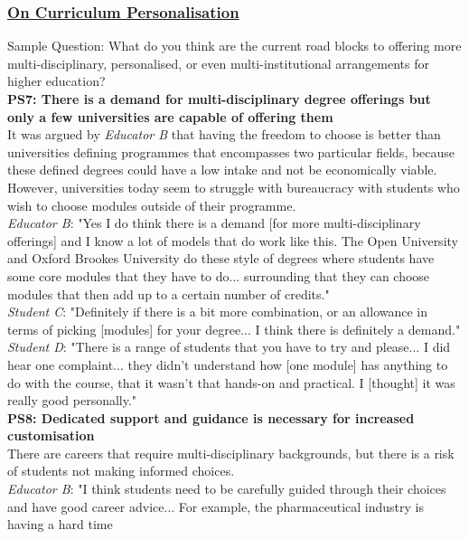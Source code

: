 \subsubsection{\underline{On Curriculum Personalisation}}

Sample Question: What do you think are the current road blocks to offering more multi-disciplinary, 
personalised, or even multi-institutional arrangements for higher education?
\vspace{0.25cm}\\
\textbf{PS7: There is a demand for multi-disciplinary degree offerings but only a few 
universities are capable of offering them}\\
It was argued by \textit{Educator B} that having the freedom to choose is better than universities 
defining programmes that encompasses two particular fields, because these defined degrees could have 
a low intake and not be economically viable. However, universities today seem to struggle with bureaucracy 
with students who wish to choose modules outside of their programme.\\
\textit{Educator B}: "Yes I do think there is a demand [for more multi-disciplinary offerings] and I know 
a lot of models that do work like this. The Open University and Oxford Brookes University do these 
style of degrees where students have some core modules that they have to do... surrounding that 
they can choose modules that then add up to a certain number of credits." \\
\textit{Student C}: "Definitely if there is a bit more combination, or an allowance in terms of 
picking [modules] for your degree... I think there is definitely a demand."\\
\textit{Student D}: "There is a range of students that you have to try and please...
I did hear one complaint... they didn't understand how [one module] has anything to do with the course, 
that it wasn't that hands-on and practical. I [thought] it was really good personally."
\vspace{0.25cm}\\
\textbf{PS8: Dedicated support and guidance is necessary for increased customisation}\\
There are careers that require multi-disciplinary backgrounds, but there is a risk of 
students not making informed choices.\\
\textit{Educator B}: "I think students need to be carefully guided through their choices and 
have good career advice... For example, the pharmaceutical industry is having a hard time 
